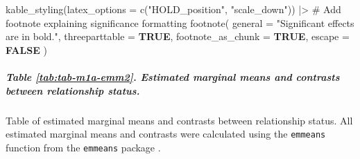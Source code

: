 \documentclass[
  bookmarksnumbered]{article}
\newenvironment{Shaded}{\begin{snugshade}}{\end{snugshade}}
\newcommand{\AttributeTok}[1]{\textcolor[rgb]{0.80,0.80,0.80}{#1}}
\newcommand{\CommentTok}[1]{\textcolor[rgb]{0.50,0.62,0.50}{#1}}
\newcommand{\ConstantTok}[1]{\textcolor[rgb]{0.86,0.64,0.64}{\textbf{#1}}}
\newcommand{\FunctionTok}[1]{\textcolor[rgb]{0.94,0.94,0.56}{#1}}
\newcommand{\NormalTok}[1]{\textcolor[rgb]{0.80,0.80,0.80}{#1}}
\newcommand{\SpecialCharTok}[1]{\textcolor[rgb]{0.86,0.64,0.64}{#1}}
\newcommand{\StringTok}[1]{\textcolor[rgb]{0.80,0.58,0.58}{#1}}
\begin{document}
\begin{Shaded}
\begin{Highlighting}[]
  \FunctionTok{kable\_styling}\NormalTok{(}\AttributeTok{latex\_options =} \FunctionTok{c}\NormalTok{(}\StringTok{"HOLD\_position"}\NormalTok{, }\StringTok{"scale\_down"}\NormalTok{)) }\SpecialCharTok{|\textgreater{}}
  \CommentTok{\# Add footnote explaining significance formatting}
  \FunctionTok{footnote}\NormalTok{(}
    \AttributeTok{general =} \StringTok{"Significant effects are in bold."}\NormalTok{, }\AttributeTok{threeparttable =} \ConstantTok{TRUE}\NormalTok{,}
    \AttributeTok{footnote\_as\_chunk =} \ConstantTok{TRUE}\NormalTok{, }\AttributeTok{escape =} \ConstantTok{FALSE}
\NormalTok{  )}
\end{Highlighting}
\end{Shaded}

\begin{table}[H]
\centering
\caption{\label{tab:tab-m1a-emm1}Estimated marginal means and contrasts between participants' gender}
\centering
{}
\end{table}

\subparagraph{Table \ref{tab:tab-m1a-emm2}. Estimated marginal means and contrasts between relationship status.}\label{table-reftabtab-m1a-emm2.-estimated-marginal-means-and-contrasts-between-relationship-status.}

Table of estimated marginal means and contrasts between relationship status. All estimated marginal means and contrasts were calculated using the \texttt{emmeans} function from the \texttt{emmeans} package \autocite{emmeanscit}.
\end{document}
